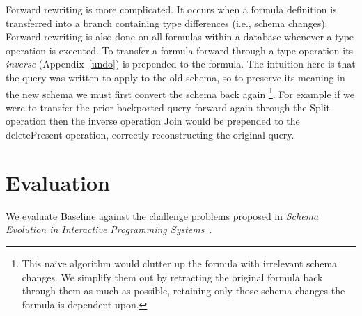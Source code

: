 \documentclass[english,submission]{programming}
\theoremstyle{definition}
\begin{document}
Forward rewriting is more complicated. It occurs when a formula definition is transferred into a branch containing type differences (i.e., schema changes). Forward rewriting is also done on all formulas within a database whenever a type operation is executed. To transfer a formula forward through a type operation its \textit{inverse} (Appendix~\ref{undo}) is prepended to the formula. The intuition here is that the query was written to apply to the old schema, so to preserve its meaning in the new schema we must first convert the schema back again
\footnote{This naive algorithm would clutter up the formula with irrelevant schema changes. We simplify them out by retracting the original formula back through them as much as possible, retaining only those schema changes the formula is dependent upon.}.
For example if we were to transfer the prior backported query forward again through the \textsf{Split} operation then the inverse operation \textsf{Join} would be prepended to the \textsf{deletePresent} operation, correctly reconstructing the original query.



\section{Evaluation}

We evaluate Baseline against the challenge problems proposed in
\textit{Schema Evolution in Interactive Programming Systems}~\cite{challenge-problems}.
\end{document}
